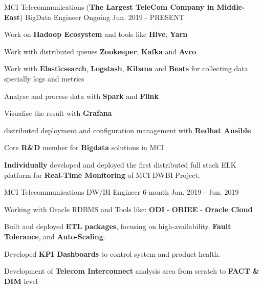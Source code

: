 

\begin{cventries}

  \cventry
    {MCI Telecommunications (\textbf{The Largest TeleCom Company in Middle-East})} %
    {BigData Engineer} %
    {Ongoing} %
    {Jun. 2019 - PRESENT} %
    {
      \begin{cvitems} %
        \item {Work on \textbf{Hadoop Ecosystem} and tools like \textbf{Hive}, \textbf{Yarn}}
        \item {Work with distributed queues \textbf{Zookeeper}, \textbf{Kafka} and \textbf{Avro}}
        \item {Work with \textbf{Elasticsearch}, \textbf{Logstash}, \textbf{Kibana} and \textbf{Beats} for collecting data specially logs and metrics}
        \item {Analyse and process data with \textbf{Spark} and \textbf{Flink}}
        \item {Visualise the result with \textbf{Grafana}}
        \item {distributed deployment and configuration management with \textbf{Redhat Ansible}}
        \item {Core \textbf{R\&D} member for \textbf{Bigdata} solutions in MCI}
        \item {\textbf{Individually} developed and deployed the first distributed full stack ELK platform for \textbf{Real-Time Monitoring} of MCI DWBI Project.}
      \end{cvitems}
    }
    
  \cventry
    {MCI Telecommunications} %
    {DW/BI Engineer} %
    {6-month} %
    {Jan. 2019 - Jun. 2019} %
    {
      \begin{cvitems} %
        \item {Working with Oracle RDBMS and Tools like: \textbf{ODI} - \textbf{OBIEE} - \textbf{Oracle Cloud}}
        \item {Built and deployed \textbf{ETL packages}, focusing on high-availability, \textbf{Fault Tolerance}, and \textbf{Auto-Scaling}.}
        \item {Developed \textbf{KPI Dashboards} to control system and product health.}
        \item {Development of \textbf{Telecom Interconnect} analysis area from scratch to \textbf{FACT \& DIM} level}
      \end{cvitems}
    }
    


\end{cventries}

